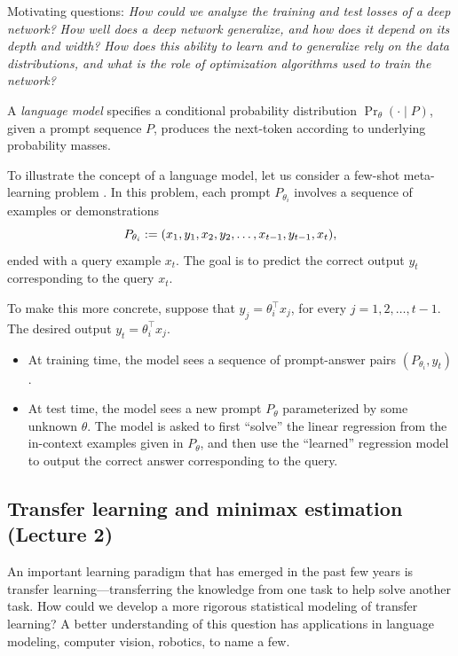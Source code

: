 Motivating questions: \emph{How could we analyze the training and test losses of a deep network?} \emph{How well does a deep network generalize, and how does it depend on its depth and width?}
\emph{How does this ability to learn and to generalize rely on the data distributions, and what is the role of optimization algorithms used to train the network?}

\bigskip
A \emph{language model} specifies a conditional probability distribution $\Pr_{\theta}(\cdot \mid P)$, given a prompt sequence $P$, produces the next-token according to underlying probability masses.

\begin{example}
    To illustrate the concept of a language model, let us consider a few-shot meta-learning problem \citep{garg2022can}.
    In this problem, each prompt $P_{\theta_i}$ involves a sequence of examples or demonstrations 
        \[ P_{\theta_i} := (x_1, y_1, x_2, y_2, \dots, x_{t-1}, y_{t-1}, x_t), \] ended with a query example $x_t$.
    The goal is to predict the correct output $y_t$ corresponding to the query $x_t$.

    To make this more concrete, suppose that $y_j = \theta_i^{\top} x_j$, for every $j = 1, 2, \dots, t-1$.
    The desired output $y_t = \theta_i^{\top} x_j$.
    \begin{itemize}
        \item At training time, the model sees a sequence of prompt-answer pairs $(P_{\theta_i}, y_t)$.

        \item At test time, the model sees a new prompt $P_\theta$ parameterized by some unknown $\theta$. The model is asked to first ``solve'' the linear regression from the in-context examples given in $P_\theta$, and then use the ``learned'' regression model to output the correct answer corresponding to the query.
    \end{itemize}
\end{example}


\subsection{Transfer learning and minimax estimation (Lecture 2)}

An important learning paradigm that has emerged in the past few years is transfer learning---transferring the knowledge from one task to help solve another task.
How could we develop a more rigorous statistical modeling of transfer learning?
A better understanding of this question has applications in language modeling, computer vision, robotics, to name a few.

